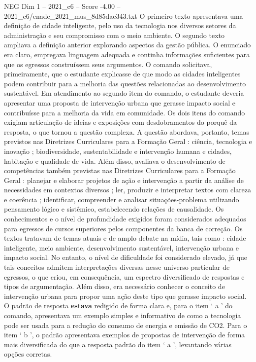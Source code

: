\begin{textsample}{NEG Dim 1 – 2021\_c6 – Score -4.00 – 2021\_c6/enade\_2021\_mus\_8d85dac343.txt}
O primeiro texto apresentava uma definição de cidade inteligente, pelo uso da tecnologia nos diversos setores da administração e seu compromisso com o meio ambiente.
O segundo texto ampliava a definição anterior explorando aspectos da gestão pública.
O enunciado era claro, empregava linguagem adequada e continha informações suficientes para que os egressos construíssem seus argumentos.
O comando solicitava, primeiramente, que o estudante explicasse de que modo as cidades inteligentes podem contribuir para a melhoria das questões relacionadas ao desenvolvimento sustentável.
Em atendimento ao segundo item do comando, o estudante deveria apresentar uma proposta de intervenção urbana que gerasse impacto social e contribuísse para a melhoria da vida em comunidade.
Os dois itens do comando exigiam articulação de ideias e exposições com desdobramentos do porquê da resposta, o que tornou a questão complexa.
A questão abordava, portanto, temas previstos nas Diretrizes Curriculares para a Formação Geral : ciência, tecnologia e inovação ; biodiversidade, sustentabilidade e intervenção humana e cidades, habitação e qualidade de vida.
Além disso, avaliava o desenvolvimento de competências também previstas nas Diretrizes Curriculares para a Formação Geral : planejar e elaborar projetos de ação e intervenção a partir da análise de necessidades em contextos diversos ; ler, produzir e interpretar textos com clareza e coerência ; identificar, compreender e analisar situações-problema utilizando pensamento lógico e sistêmico, estabelecendo relações de causalidade.
Os conhecimentos e o nível de profundidade exigidos foram considerados adequados para egressos de cursos superiores pelos componentes da banca de correção.
Os textos tratavam de temas atuais e de amplo debate na mídia, tais como : cidade inteligente, meio ambiente, desenvolvimento sustentável, intervenção urbana e impacto social.
No entanto, o nível de dificuldade foi considerado elevado, já que tais conceitos admitem interpretações diversas nesse universo particular de egressos, o que criou, em consequência, um espectro diversificado de respostas e tipos de argumentação.
Além disso, era necessário conhecer o conceito de intervenção urbana para propor uma ação deste tipo que gerasse impacto social.
O padrão de resposta \textbf{estava} redigido de forma clara e, para o item ‘ a ’ do comando, apresentava um exemplo simples e informativo de como a tecnologia pode ser usada para a redução do consumo de energia e emissão de CO2.
Para o item ‘ b ’, o padrão apresentava exemplos de propostas de intervenção de forma mais diversificada do que a resposta padrão do item ‘ a ’, levantando várias opções corretas.

\end{textsample}
